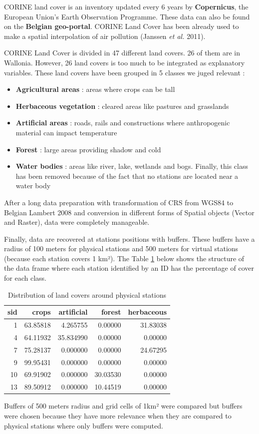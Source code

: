 \documentclass[12pt,twoside]{reedthesis}
\theoremstyle{definition}
\theoremstyle{definition}
\theoremstyle{definition}
\theoremstyle{remark}
\begin{document}
CORINE land cover is an inventory updated every 6 years by
\textbf{Copernicus}, the European Union's Earth Observation Programme.
These data can also be found on the \textbf{Belgian geo-portal}. CORINE
Land Cover has been already used to make a spatial interpolation of air
pollution (Janssen \emph{et al.} 2011).

CORINE Land Cover is divided in 47 different land covers. 26 of them are
in Wallonia. However, 26 land covers is too much to be integrated as
explanatory variables. These land covers have been grouped in 5 classes
we juged relevant :
\begin{itemize}
\item
  \textbf{Agricultural areas} : areas where crops can be tall
\item
  \textbf{Herbaceous vegetation} : cleared areas like pastures and
  grasslands
\item
  \textbf{Artificial areas} : roads, rails and constructions where
  anthropogenic material can impact temperature
\item
  \textbf{Forest} : large areas providing shadow and cold
\item
  \textbf{Water bodies} : areas like river, lake, wetlands and bogs.
  Finally, this class has been removed because of the fact that no
  stations are located near a water body
\end{itemize}
After a long data preparation with transformation of CRS from WGS84 to
Belgian Lambert 2008 and conversion in different forms of Spatial
objects (Vector and Raster), data were completely manageable.

Finally, data are recovered at stations positions with buffers. These
buffers have a radius of 100 meters for physical stations and 500 meters
for virtual stations (because each station covers 1 km²). The Table
\ref{tab:clcperc} below shows the structure of the data frame where each
station identified by an ID has the percentage of cover for each class.
\begin{table}

\caption{\label{tab:clcperc}Distribution of land covers around physical stations}
\centering
\begin{tabular}[t]{rrrrr}
\toprule
\textbf{sid} & \textbf{crops} & \textbf{artificial} & \textbf{forest} & \textbf{herbaceous}\\
\midrule
1 & 63.85818 & 4.265755 & 0.00000 & 31.83038\\
4 & 64.11932 & 35.834990 & 0.00000 & 0.00000\\
7 & 75.28137 & 0.000000 & 0.00000 & 24.67295\\
9 & 99.95431 & 0.000000 & 0.00000 & 0.00000\\
10 & 69.91902 & 0.000000 & 30.03530 & 0.00000\\
13 & 89.50912 & 0.000000 & 10.44519 & 0.00000\\
\bottomrule
\end{tabular}
\end{table}
Buffers of 500 meters radius and grid cells of 1km² were compared but
buffers were chosen because they have more relevance when they are
compared to physical stations where only buffers were computed.
\end{document}
